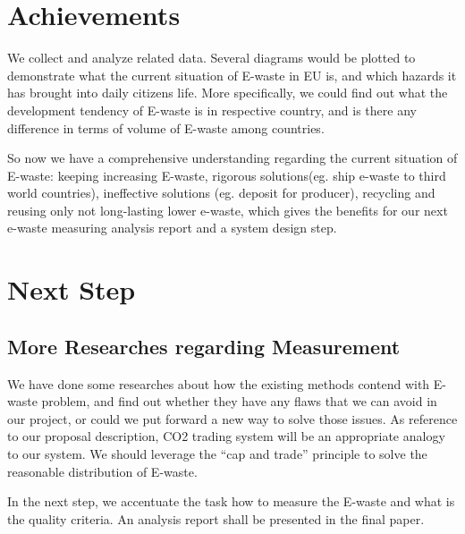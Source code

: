 \documentclass[sigchi-a, authorversion]{acmart}
\begin{document}

\maketitle

\section{Achievements}

We collect and analyze related data. Several diagrams would be plotted to demonstrate
what the current situation of E-waste in EU is, and which hazards it has brought into
daily citizens life. More specifically, we could find out what the development tendency
of E-waste is in respective country, and is there any difference in terms of volume of
E-waste among countries. 

So now we have a comprehensive understanding regarding the current situation of E-waste: 
keeping increasing E-waste, rigorous solutions(eg. ship e-waste to third world 
countries)\cite{Robinson2009}, ineffective solutions (eg. deposit for producer), 
recycling and reusing only not long-lasting lower e-waste\cite{kahhat2008exploring, BMUB},
which gives the benefits for our next e-waste measuring analysis report and a system design step.

\section{Next Step}

\subsection{More Researches regarding Measurement}

We have done some researches about how the existing methods \cite{DUH, NABU} 
contend with E-waste problem, and find out whether they have any flaws that we 
can avoid in our project, or could we put forward a new way to solve those issues.
As reference to our proposal description, CO2 trading system will be an appropriate analogy 
to our system. We should leverage the  ``cap and trade'' principle to solve the 
reasonable distribution of E-waste. 

In the next step, we accentuate the task how to measure the E-waste and what is the quality criteria.
An analysis report shall be presented in the final paper.
\end{document}
